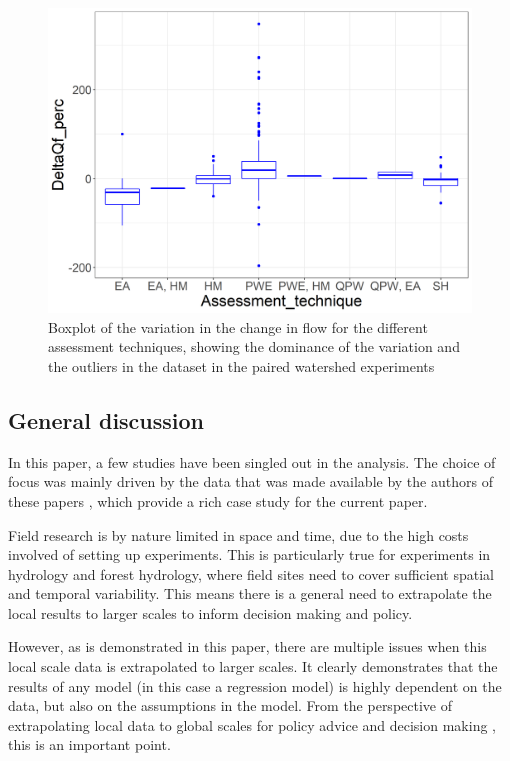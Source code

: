 \documentclass[]{elsarticle} %
\begin{document}
\begin{figure}
\includegraphics[width=0.9\linewidth]{AssessmentTechnique_byDeltaQf} \caption{Boxplot of the variation in the change in flow for the different assessment techniques, showing the dominance of the variation and the outliers in the dataset in the paired watershed experiments}\label{fig:assessment}
\end{figure}

\hypertarget{general-discussion}{%
\subsection{General discussion}\label{general-discussion}}

In this paper, a few studies have been singled out in the analysis. The choice of focus was mainly driven by the data that was made available by the authors of these papers \citep{zhang2017, filoso2017}, which provide a rich case study for the current paper.

Field research is by nature limited in space and time, due to the high costs involved of setting up experiments. This is particularly true for experiments in hydrology and forest hydrology, where field sites need to cover sufficient spatial and temporal variability. This means there is a general need to extrapolate the local results to larger scales to inform decision making and policy.

However, as is demonstrated in this paper, there are multiple issues when this local scale data is extrapolated to larger scales. It clearly demonstrates that the results of any model (in this case a regression model) is highly dependent on the data, but also on the assumptions in the model. From the perspective of extrapolating local data to global scales for policy advice and decision making \citep[i.e.][]{hoekvandijke2022, jackson2005}, this is an important point.
\end{document}
